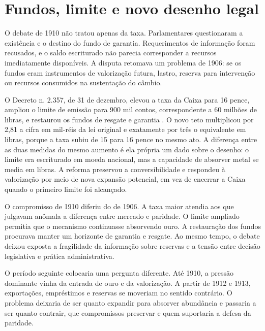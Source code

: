 \section{Fundos, limite e novo desenho legal}

O debate de 1910 não tratou apenas da taxa. Parlamentares questionaram a existência e o destino do fundo de garantia. Requerimentos de informação foram recusados, e o saldo escriturado não parecia corresponder a recursos imediatamente disponíveis. A disputa retomava um problema de 1906: se os fundos eram instrumentos de valorização futura, lastro, reserva para intervenção ou recursos consumidos na sustentação do câmbio.


O Decreto n. 2.357, de 31 de dezembro, elevou a taxa da Caixa para 16 pence, ampliou o limite de emissão para 900 mil contos, correspondente a 60 milhões de libras, e restaurou os fundos de resgate e garantia \cite{brasil1910taxa16}. O novo teto multiplicou por 2,81 a cifra em mil-réis da lei original e exatamente por três o equivalente em libras, porque a taxa subiu de 15 para 16 pence no mesmo ato. A diferença entre as duas medidas do mesmo aumento é ela própria um dado sobre o desenho: o limite era escriturado em moeda nacional, mas a capacidade de absorver metal se media em libras. A reforma preservou a conversibilidade e respondeu à valorização por meio de nova expansão potencial, em vez de encerrar a Caixa quando o primeiro limite foi alcançado.

O compromisso de 1910 diferiu do de 1906. A taxa maior atendia aos que julgavam anômala a diferença entre mercado e paridade. O limite ampliado permitia que o mecanismo continuasse absorvendo ouro. A restauração dos fundos procurava manter um horizonte de garantia e resgate. Ao mesmo tempo, o debate deixou exposta a fragilidade da informação sobre reservas e a tensão entre decisão legislativa e prática administrativa.


O período seguinte colocaria uma pergunta diferente. Até 1910, a pressão dominante vinha da entrada de ouro e da valorização. A partir de 1912 e 1913, exportações, empréstimos e reservas se moveriam no sentido contrário. O problema deixaria de ser quanto expandir para absorver abundância e passaria a ser quanto contrair, que compromissos preservar e quem suportaria a defesa da paridade.
